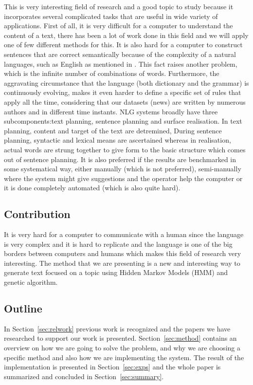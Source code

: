\documentclass[a4paper,12pt]{article}
\begin{document}
This is very interesting field of research and a good topic to study because it
incorporates several complicated tasks that are useful in wide variety of
applications. First of all, it is very difficult for a computer to understand
the content of a text, there has been a lot of work done in this field and we
will apply one of few different methods for this. It is also hard for a computer
to construct sentences that are correct semantically because of the
complexity of a natural languages, such as English as mentioned in
\cite{nlgScratch}. This fact raises another problem, which is the infinite
number of combinations of words. Furthermore, the aggravating circumstance that
the language (both dictionary and the grammar) is continuously evolving, makes
it even harder to define a specific set of rules that apply all the time,
considering that our datasets (news) are written by numerous authors and in
different time instants. NLG systems broadly have three subcomponents:text
planning, sentence planning and surface realisation.
In text planning, content and target of the text are detremined, During sentence
planning, syntactic and lexical means are ascertained whereas in realisation, 
actual words are strung together to give form to the basic structure which comes out
of sentence planning. 
It is also preferred if the results are benchmarked in some systematical way,
either manually (which is not preferred), semi-manually where the system might
give suggestions and the operator help the computer or it is done completely
automated (which is also quite hard).


\subsection{Contribution}
It is very hard for a computer to communicate with a human since the language is
very complex and it is hard to replicate and the language is one of the big
borders between computers and humans which makes this field of research very
interesting. The method that we are presenting is a new and interesting way to
generate text focused on a topic using Hidden Markov Models (HMM) and genetic
algorithm.

\subsection{Outline}
In Section~\ref{sec:relwork} previous work is recognized and the papers we have
researched to support our work is presented. Section~\ref{sec:method} contains
an overview on how we are going to solve the problem, and why we are choosing a
specific method and also how we are implementing the system. The result of the
implementation is presented in Section~\ref{sec:exps} and the whole paper is
summarized and concluded in Section~\ref{sec:summary}.
\end{document}
